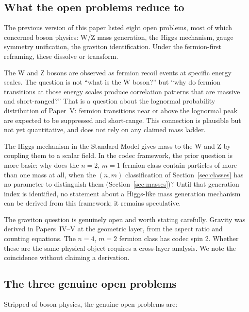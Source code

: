\documentclass[11pt]{article}
\begin{document}
\subsection{What the open problems reduce to}

The previous version of this paper listed eight open problems,
most of which concerned boson physics: W/Z mass generation, the
Higgs mechanism, gauge symmetry unification, the graviton
identification.
Under the fermion-first reframing, these dissolve or transform.

The W and Z bosons are observed as fermion recoil events at specific
energy scales.
The question is not ``what is the W boson?'' but ``why do fermion
transitions at those energy scales produce correlation patterns that
are massive and short-ranged?''
That is a question about the lognormal probability distribution of
Paper~V: fermion transitions near or above the lognormal peak are
expected to be suppressed and short-range.
This connection is plausible but not yet quantitative, and does not
rely on any claimed mass ladder.

The Higgs mechanism in the Standard Model gives mass to the W and Z
by coupling them to a scalar field.
In the codec framework, the prior question is more basic: why does
the $n{=}2$, $m{=}1$ fermion class contain particles of more than
one mass at all, when the $(n,m)$ classification of
Section~\ref{sec:classes} has no parameter to distinguish them
(Section~\ref{sec:masses})?
Until that generation index is identified, no statement about a
Higgs-like mass generation mechanism can be derived from this
framework; it remains speculative.

The graviton question is genuinely open and worth stating carefully.
Gravity was derived in Papers~IV--V at the geometric layer, from
the aspect ratio and counting equations.
The $n{=}4$, $m{=}2$ fermion class has codec spin 2.
Whether these are the same physical object requires a cross-layer
analysis.
We note the coincidence without claiming a derivation.

\subsection{The three genuine open problems}

Stripped of boson physics, the genuine open problems are:
\end{document}
